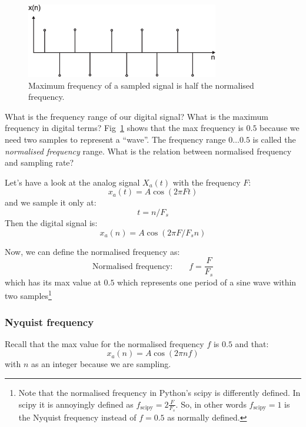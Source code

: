 \documentclass[12pt,a4paper]{article}
\begin{document}
\begin{figure}[!hbt]
\begin{center}
\mbox{\includegraphics[width=0.75\textwidth]{max_sampl}}
\end{center}
\caption{Maximum frequency of a sampled signal is half the
normalised frequency.
\label{max_sampl}}
\end{figure}


What is the frequency range of our digital signal? What is
the maximum frequency in digital terms? Fig~\ref{max_sampl} shows that the
max frequency is $0.5$ because we need two samples to
represent a ``wave''. The frequency range $0\ldots 0.5$
is called the \textsl{normalised frequency} range. What is the relation
between normalised frequency and sampling rate?

Let's have a look at the analog signal $X_{a}(t)$ with the frequency $F$:
\begin{equation}
x_{a}(t) = A\cos (2\pi F t)
\end{equation}
and we sample it only at:
\begin{equation}
t = n/F_s
\end{equation}
Then the digital signal is:
\begin{equation}
x_{a}(n) = A \cos (2 \pi F/F_s n)
\end{equation}

Now, we can define the normalised frequency as:
\begin{equation}
\mbox{Normalised frequency:} \qquad f =  \frac {F}{F_s}
\end{equation}
which has its max value at $0.5$ which represents one period of
a sine wave within two samples\footnote{Note that the normalised
frequency in Python's scipy is differently defined. In scipy it is
annoyingly defined as $f_{\mbox{scipy}} =  2 \frac {F}{F_s}$. So, in other
words $f_{\mbox{scipy}}=1$ is the Nyquist frequency instead
of $f=0.5$ as normally defined.}


\subsubsection{Nyquist frequency}
Recall that the max value for the normalised frequency $f$ is $0.5$
and that:
\begin{equation}
x_{a}(n) = A \cos (2 \pi n f)
\end{equation}
with $n$ as an integer because
we are sampling.
\end{document}
